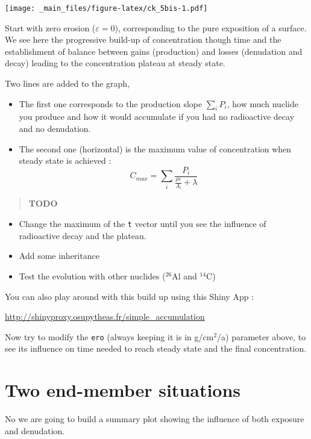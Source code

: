 \documentclass[
]{book}
\providecommand{\tightlist}{%
  \setlength{\itemsep}{0pt}\setlength{\parskip}{0pt}}
\begin{document}
\texttt{[image: \_main\_files/figure-latex/ck\_5bis-1.pdf]}

Start with zero erosion (\(\varepsilon=0\)), corresponding to the pure exposition of a surface.
We see here the progressive build-up of concentration though time and the establishment of balance between gains (production) and losses (denudation and decay) leading to the concentration plateau at steady state.

Two lines are added to the graph,

\begin{itemize}
\tightlist
\item
  The first one corresponds to the production slope \(\sum_i P_i\), how much nuclide you produce and how it would accumulate if you had no radioactive decay and no denudation.
\item
  The second one (horizontal) is the maximum value of concentration when steady state is achieved :
  \[ C_{max}=\sum_i \frac{P_i}{\frac{\rho \varepsilon}{\Lambda_i}+\lambda} \]
\end{itemize}

\begin{quote}
\textbf{TODO}
\end{quote}

\begin{itemize}
\tightlist
\item
  Change the maximum of the \texttt{t} vector until you see the influence of radioactive decay and the plateau.
\item
  Add some inheritance
\item
  Test the evolution with other nuclides (\(^{26}\)Al and \(^{14}\)C)
\end{itemize}

You can also play around with this build up using this Shiny App :

\url{http://shinyproxy.osupytheas.fr/simple_accumulation}

Now try to modify the \texttt{ero} (always keeping it is in g/cm\(^2\)/a) parameter above, to see its influence on time needed to reach steady state and the final concentration.

\hypertarget{two-end-member-situations}{%
\section{Two end-member situations}\label{two-end-member-situations}}

No we are going to build a summary plot showing the influence of both exposure and denudation.
\end{document}
